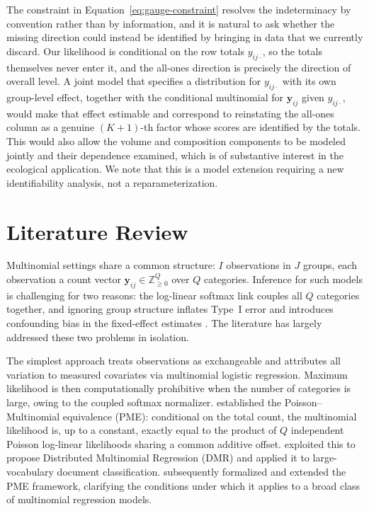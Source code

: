 The constraint in Equation~\eqref{eq:gauge-constraint} resolves the indeterminacy by convention rather than by information, and it is natural to ask whether the missing direction could instead be identified by bringing in data that we currently discard. Our likelihood is conditional on the row totals $y_{ij\cdot}$, so the totals themselves never enter it, and the all-ones direction is precisely the direction of overall level. A joint model that specifies a distribution for $y_{ij\cdot}$ with its own group-level effect, together with the conditional multinomial for $\bm{y}_{ij}$ given $y_{ij\cdot}$, would make that effect estimable and correspond to reinstating the all-ones column as a genuine $(K{+}1)$-th factor whose scores are identified by the totals. This would also allow the volume and composition components to be modeled jointly and their dependence examined, which is of substantive interest in the ecological application. We note that this is a model extension requiring a new identifiability analysis, not a reparameterization.
\fi

\section{Literature Review}
\label{sec:literature-review}

Multinomial settings share a common structure: $I$ observations in $J$ groups, each observation a count vector $\mathbf{y}_{ij}\in\mathbb{Z}_{\geq0}^Q$ over $Q$ categories. Inference for such models is challenging for two reasons: the log-linear softmax link couples all $Q$ categories together, and ignoring group structure inflates Type~I error and introduces confounding bias in the fixed-effect estimates \citep{Lee2019}. The literature has largely addressed these two problems in isolation.

The simplest approach treats observations as exchangeable and attributes all variation to measured covariates via multinomial logistic regression. Maximum likelihood is then computationally prohibitive when the number of categories is large, owing to the coupled softmax normalizer. \citet{Baker1994} established the Poisson--Multinomial equivalence (PME): conditional on the total count, the multinomial likelihood is, up to a constant, exactly equal to the product of $Q$ independent Poisson log-linear likelihoods sharing a common additive offset. \citet{Taddy2015} exploited this to propose Distributed Multinomial Regression (DMR) and applied it to large-vocabulary document classification. \citet{Lee2017} subsequently formalized and extended the PME framework, clarifying the conditions under which it applies to a broad class of multinomial regression models.

